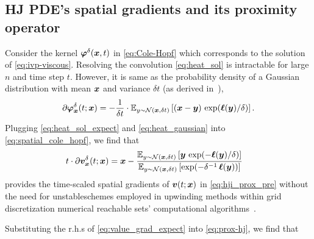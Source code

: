 \subsection{HJ PDE's spatial gradients and its proximity operator}
%
Consider the kernel $\bm{\varphi}^\delta(\bm{x}, t)$ in \eqref{eq:Cole-Hopf} which corresponds to the solution of \eqref{eq:ivp-viscous}. Resolving the convolution \eqref{eq:heat_sol} is intractable for large $n$ and time step $t$. However, it is same as the probability density of a Gaussian distribution with mean $\bm{x}$ and variance $\delta t$ (as derived in~\citet[Appendix B]{HJMAD}), \ie
%
\begin{align}
\partial \bm{\varphi}_{\bm{x}}^\delta(t; \bm{x}) = -\dfrac{1}{\delta t} \cdot \mathbb{E}_{y\sim\mathcal{N}(\bm{x}, \delta t)} \left[(\bm{x} - \bm{y})\,\exp(\bm{\ell}(\bm{y})/\delta)\right].
\label{eq:heat_gaussian}
\end{align}
%
Plugging \eqref{eq:heat_sol_expect} and \eqref{eq:heat_gaussian} into \eqref{eq:spatial_cole_hopf}, we find that 
%
\begin{align}
t \cdot \partial \valuefunc_{\state}^\delta(t; \state) %
%
&=  \state -\dfrac{\bb{E}_{y\sim\mc{N}(\state, \delta t)} \left[ \bm{y}\,\exp(-\term(\bm{y})/\delta)\right]}{\bb{E}_{y\sim\mc{N}(\state, \delta t)}\left[\exp(-\delta^{-1} \, \term(\bm{y}))\right]}
\label{eq:value_grad_expect}
\end{align}
%
provides the time-scaled spatial gradients of $\bm{v}(t; \bm{x})$ in \eqref{eq:hji_prox_pre} without the need for unstableschemes employed in upwinding methods within grid discretization numerical reachable sets' computational algorithms~\citet{levpyconf, LevelSetTOMS, MitchellLSToolbox}.

Substituting the r.h.s of \eqref{eq:value_grad_expect} into \eqref{eq:prox-hj}, we find that 
%
%


